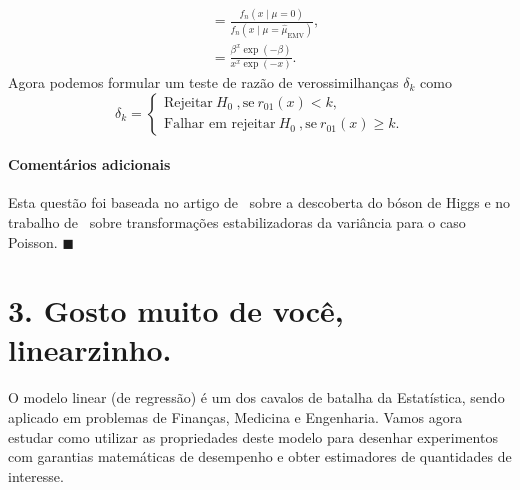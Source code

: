 \documentclass[a4paper,10pt, notitlepage]{report}
\begin{document}
{\begin{align*}
 &= \frac{f_n(x \mid \mu = 0)}{f_n(x \mid \mu = \hat{\mu}_{\text{EMV}})},\\
 &= \frac{\beta^x\exp(-\beta)}{x^x\exp(-x)}.
\end{align*}
Agora podemos formular um teste de razão de verossimilhanças $\delta_k$ como
\begin{equation*}
 \delta_k = \begin{cases}
             \text{Rejeitar}\: H_0\:, \text{se}\: r_{01}(x) < k,\\
             \text{Falhar em rejeitar}\: H_0\:, \text{se}\: r_{01}(x) \geq k.
            \end{cases}
\end{equation*}
\paragraph{Comentários adicionais} Esta questão foi baseada no artigo de~\cite{VanDyk2014} sobre a descoberta do bóson de Higgs e no trabalho de~\cite{Freeman1950} sobre transformações estabilizadoras da variância para o caso Poisson.
$\blacksquare$
}

\section*{3. Gosto muito de você, linearzinho.}

O modelo linear (de regressão) é um dos cavalos de batalha da Estatística, sendo aplicado em problemas de Finanças, Medicina e Engenharia.
Vamos agora estudar como utilizar as propriedades deste modelo para desenhar experimentos com garantias matemáticas de desempenho e obter estimadores de quantidades de interesse.
\end{document}
